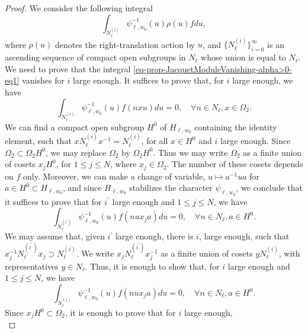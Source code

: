 \documentclass[12pt]{amsart}
\theoremstyle{remark}
\begin{document}
\begin{proof}
We consider the following integral
\begin{equation}
\label{eq-prop-JacquetModuleVanishing-alpha>0-eq1}
\int_{N_{\ell}^{(i)}} \psi_{\ell,w_0}^{-1}(u)\rho(u)f du,
\end{equation}
where $\rho(u)$ denotes the right-translation action by $u$, and $\{N_{\ell}^{(i)}\}_{i=0}^\infty$ is an ascending sequence of compact open subgroups in $N_{\ell}$ whose union is equal to $N_{\ell}$. We need to prove that the integral \eqref{eq-prop-JacquetModuleVanishing-alpha>0-eq1} vanishes for $i$ large enough. It suffices to prove that, for $i$ large enough, we have
\begin{equation}
\label{eq-prop-JacquetModuleVanishing-alpha>0-eq2}
\int_{N_{\ell}^{(i)}} \psi_{\ell,w_0}^{-1}(u)f( n x u) du=0, \quad \forall n\in N_{\ell}, x\in \Omega_2. 
\end{equation}
We can find a compact open subgroup $H^0$ of $H_{\ell,w_0}$ containing the identity element, such that $x N_{\ell}^{(i)}x^{-1}=N_{\ell}^{(i)}$, for all $x\in H^0$ and $i$ large enough. Since $\Omega_2\subset \Omega_2 H^0$, we may replace $\Omega_2$ by $\Omega_2 H^0$.  Thus we may write $\Omega_2$ as a finite union of cosets $x_j H^0$, for $1\le j \le N$, where $x_j\in \Omega_2$. The number of these cosets depends on $f$ only. Moreover, we can make a change of variable, $u\mapsto a^{-1}u a$ for $a\in H^0\subset H_{\ell, w_0}$, and since $H_{\ell, w_0}$ stabilizes the character $\psi_{\ell, w_0}$, we conclude that it suffices to prove that for $i^\prime$ large enough and $1\le j \le N$, we have
\begin{equation*}
\int_{N_{\ell}^{(i^\prime)}} \psi_{\ell,w_0}^{-1}(u)f( n u x_j  a) du=0, \quad \forall n\in N_{\ell}, a\in H^0. 
\end{equation*}
We may assume that, given $i^\prime$ large enough, there is $i$, large enough, such that $x_j^{-1} N_{\ell}^{(i^\prime)} x_j \supset N_{\ell}^{(i)}$. We write $x_j N_{\ell}^{(i^\prime)} x_j^{-1}$ as a finite union of cosets $y N_{\ell}^{(i)}$,  with representatives $y\in N_{\ell}$. Thus, it is enough to show that, for $i$ large enough and $1\le j \le N$, we have 
\begin{equation*}
\int_{N_{\ell}^{(i)}} \psi_{\ell,w_0}^{-1}(u)f( n u x_j a) du=0, \quad \forall n\in N_{\ell}, a\in H^0. 
\end{equation*}
Since $x_j H^0\subset \Omega_2$, it is enough to prove that for $i$ large enough, 
\begin{equation}
\label{eq-prop-JacquetModuleVanishing-alpha>0-eq3}

\end{equation}
\end{proof}
\end{document}
